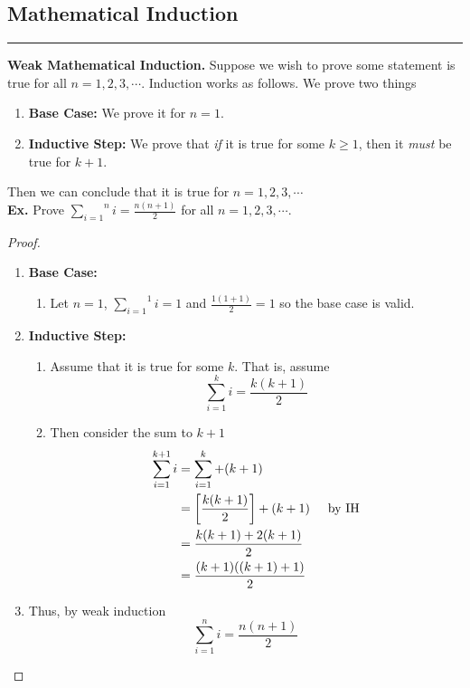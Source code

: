 \documentclass[class=article, crop=false]{standalone}
\def\inlinesum#1#2{\overset{#2}{\underset{#1}{\sum}}}
\begin{document}
\subsection{Mathematical Induction}
\rule{\textwidth}{1pt}
\textbf{Weak Mathematical Induction.} Suppose we wish to prove some statement is true for all $n=1,2,3,\cdots$.
Induction works as follows. We prove two things
\begin{enumerate}[1.]
	\item \textbf{Base Case:} We prove it for $n=1$.
	\item \textbf{Inductive Step:} We prove that \emph{if} it is true for some $k\geq 1$, then it \emph{must} be true for $k+1$.
\end{enumerate}
Then we can conclude that it is true for $n=1,2,3,\cdots$\\
\textbf{Ex.} Prove $\inlinesum{i=1}{n}i = \frac{n(n+1)}{2}$ for all $n=1,2,3,\cdots$.
\begin{proof}
	$ $\\
	\begin{enumerate}
		\item[] \textbf{Base Case:} 
			\begin{enumerate}
				\item[] Let $n=1$, $\inlinesum{i=1}{1} i = 1$ and $\frac{1(1+1)}{2}=1$ so the base case is valid.
			\end{enumerate}
		\item[] \textbf{Inductive Step:}
			\begin{enumerate}
				\item[] Assume that it is true for some $k$. That is, assume $$\sum_{i=1}^{k} i = \frac{k(k+1)}{2}$$
				\item[] Then consider the sum to $k+1$
					\begin{align*}
						\sum_{i=1}^{k+1} i &= \sum_{i=1}^{k} + (k+1) \\
						&= \left[\frac{k(k+1)}{2}\right] + (k+1) \hspace{5mm}\text{by IH} \\
						&= \frac{k(k+1) + 2(k+1)}{2} \\
						&= \frac{(k+1)((k+1)+1)}{2}
					\end{align*}
			\end{enumerate}
		\item[] Thus, by weak induction $$\inlinesum{i=1}{n}i = \frac{n(n+1)}{2}$$
	\end{enumerate}
\end{proof}
\end{document}
